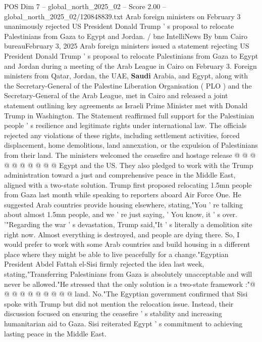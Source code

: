 \begin{textsample}{POS Dim 7 – global\_north\_2025\_02 – Score 2.00 – global\_north\_2025\_02/120848839.txt}  \label{ex:f7_pos_388}
Arab foreign ministers on February 3 unanimously rejected US President Donald Trump ' s proposal to relocate Palestinians from Gaza to Egypt and Jordan. / bne IntelliNews By bnm Cairo bureauFebruary 3, 2025 Arab foreign ministers issued a statement rejecting US President Donald Trump ' s proposal to relocate Palestinians from Gaza to Egypt and Jordan during a meeting of the Arab League in Cairo on February 3.
Foreign ministers from Qatar, Jordan, the UAE, \textbf{Saudi} Arabia, and Egypt, along with the Secretary-General of the Palestine Liberation Organisation ( PLO ) and the Secretary-General of the Arab League, met in Cairo and released a joint statement outlining key agreements as Israeli Prime Minister met with Donald Trump in Washington.
The Statement reaffirmed full support for the Palestinian people ' s resilience and legitimate rights under international law.
The officials rejected any violations of these rights, including settlement activities, forced displacement, home demolitions, land annexation, or the expulsion of Palestinians from their land.
The ministers welcomed the ceasefire and hostage release @ @ @ @ @ @ @ @ @ @ Egypt and the US.
They also pledged to work with the Trump administration toward a just and comprehensive peace in the Middle East, aligned with a two-state solution.
Trump first proposed relocating 1.5mn people from Gaza last month while speaking to reporters aboard Air Force One.
He suggested Arab countries provide housing elsewhere, stating,"You ' re talking about almost 1.5mn people, and we ' re just saying, ' You know, it ' s over. '"Regarding the war ' s devastation, Trump said,"It ' s literally a demolition site right now.
Almost everything is destroyed, and people are dying there.
So, I would prefer to work with some Arab countries and build housing in a different place where they might be able to live peacefully for a change."Egyptian President Abdel Fattah el-Sisi firmly rejected the idea last week, stating,"Transferring Palestinians from Gaza is absolutely unacceptable and will never be allowed."He stressed that the only solution is a two-state framework :"@ @ @ @ @ @ @ @ @ @ land.
No."The Egyptian government confirmed that Sisi spoke with Trump but did not mention the relocation issue.
Instead, their discussion focused on ensuring the ceasefire ' s stability and increasing humanitarian aid to Gaza.
Sisi reiterated Egypt ' s commitment to achieving lasting peace in the Middle East.

\end{textsample}
